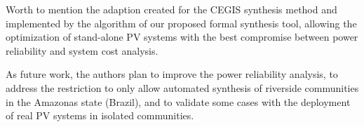 \documentclass[journal]{IEEEtran}
\begin{document}
Worth to mention the adaption created for the CEGIS synthesis method and implemented by the algorithm of our proposed formal synthesis tool, allowing the optimization of stand-alone PV systems with the  best compromise between power reliability and system cost analysis.

As future work, the authors plan to improve the power reliability analysis, to address the restriction to only allow automated synthesis of riverside communities in the Amazonas state (Brazil), and to validate some cases with the deployment of real PV systems in isolated communities.

%
%



%
%
\end{document}
